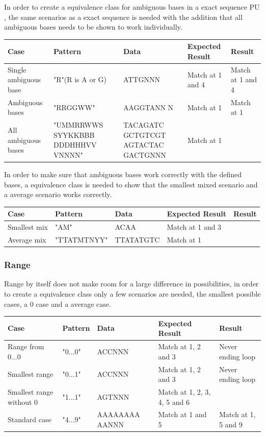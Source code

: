 \documentclass[12pt]{article}
\newcommand{\pu}{PU }
\begin{document}
In order to create a equivalence class for ambiguous bases in a exact sequence \pu, the same
scenarios as a exact sequence is needed with the addition that all ambiguous bases needs to be
shown to work individually. 
\begin{table}[H]
\begin{tabular}{p{4cm}|p{3.6cm}|p{2.5cm}|p{2.2cm}|p{2.2cm}}
Case 			& Pattern & Data & Expected Result & Result \\ \hline
Single ambiguous base & "R"(R is A or G) & ATTGNNN & Match at 1 and 4 & Match at 1 and 4 \\ \hline
Ambiguous bases	& "RRGGWW" & AAGGTANN N & Match at 1 & Match at 1 \\ \hline
All ambiguous bases & "UMMRRWWS SYYKKBBB DDDHHHVV VNNNN" & TACAGATC GCTGTCGT AGTACTAC GACTGNNN & Match at 1 & \\ \hline
\end{tabular}
\end{table}

In order to make sure that ambiguous bases work correctly with the defined bases, a equivalence class is needed
to show that the smallest mixed scenario and a average scenario works correctly.
\begin{table}[H]
\begin{tabular}{p{4cm}|p{3.6cm}|p{2.5cm}|p{2.2cm}|p{2.2cm}}
Case 			& Pattern & Data & Expected Result & Result \\ \hline
Smallest mix		& "AM" & ACAA & Match at 1 and 3 & \\ \hline
Average mix		& "TTATMTNYY" & TTATATGTC & Match at 1 & 
\end{tabular}
\end{table}


\subsubsection{Range}
Range by itself does not make room for a large difference in possibilities, in order to create a 
equivalence class only a few scenarios are needed, the smallest possible cases, a 0 case and a average case.
\begin{table}[H]
\begin{tabular}{p{4cm}|p{3cm}|p{2.5cm}|p{2.5cm}|p{2.5cm}}
Case 			& Pattern & Data & Expected Result & Result \\ \hline
Range from 0...0	& "0...0" & ACCNNN & Match at 1, 2 and 3 & Never ending loop \\ \hline
Smallest range 	& "0...1" & ACCNNN & Match at 1, 2 and 3 & Never ending loop \\ \hline
Smallest range without 0 & "1...1" & AGTNNN & Match at 1, 2, 3, 4, 5 and 6 & \\ \hline
Standard case	& "4...9" & AAAAAAAA AANNN & Match at 1 and 5 & Match at 1, 5 and 9
\end{tabular}
\end{table} 
\end{document}
